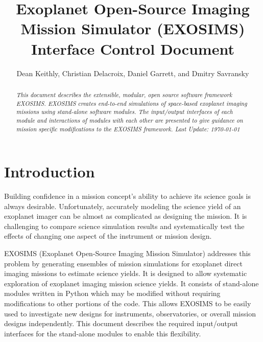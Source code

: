 \documentclass[cleanfoot]{asme2ej}
\title{Exoplanet Open-Source Imaging Mission Simulator (EXOSIMS) \\ Interface Control Document}
\author{Dean Keithly, Christian Delacroix, Daniel Garrett, and Dmitry Savransky
    \affiliation{
    Sibley School of Mechanical and Aerospace Engineering\\
	Cornell University\\
	Ithaca, NY 14853
    }	
}
\begin{document}
\maketitle    

\begin{abstract}
{\it This document describes the extensible, modular, open source software framework EXOSIMS.  EXOSIMS creates end-to-end simulations of space-based exoplanet imaging missions using stand-alone software modules.  The input/output interfaces of each module and interactions of modules with each other are presented to give guidance on mission specific modifications to the EXOSIMS framework. Last Update: \today}
\end{abstract}

\tableofcontents

\begin{nomenclature}
\end{nomenclature}


\section{Introduction} 
Building confidence in a mission concept's ability to achieve its science goals is always desirable.  Unfortunately, accurately modeling the science yield of an exoplanet imager can be almost as complicated as designing the mission.  It is challenging to compare science simulation results and systematically test the effects of changing one aspect of the instrument or mission design.

EXOSIMS (Exoplanet Open-Source Imaging Mission Simulator) addresses this problem by generating ensembles of mission simulations for exoplanet direct imaging missions to estimate science yields. It is designed to allow systematic exploration of exoplanet imaging mission science yields.  It consists of stand-alone modules written in Python which may be modified without requiring modifications to other portions of the code. This allows EXOSIMS to be easily used to investigate new designs for instruments, observatories, or overall mission designs independently. This document describes the required input/output interfaces for the stand-alone modules to enable this flexibility.
\end{document}
